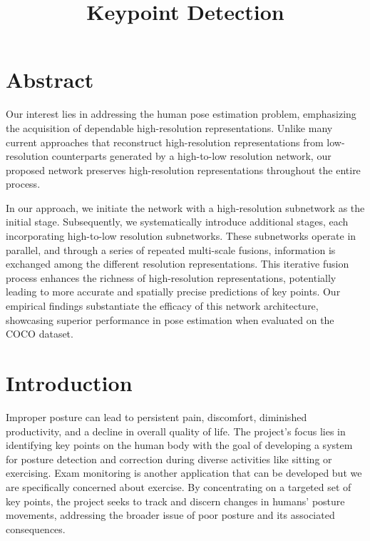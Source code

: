 \documentclass{article}
\title{Keypoint Detection}
\author{
}
\begin{document}
\maketitle

\section{\fontsize{12}{14}\selectfont Abstract}

Our interest lies in addressing the human pose estimation problem, emphasizing the acquisition of dependable high-resolution representations. Unlike many current approaches that reconstruct high-resolution representations from low-resolution counterparts generated by a high-to-low resolution network, our  proposed network preserves high-resolution representations throughout the entire process.

In our approach, we initiate the network with a high-resolution subnetwork as the initial stage. Subsequently, we systematically introduce additional stages, each incorporating high-to-low resolution subnetworks. These subnetworks operate in parallel, and through a series of repeated multi-scale fusions, information is exchanged among the different resolution representations. This iterative fusion process enhances the richness of high-resolution representations, potentially leading to more accurate and spatially precise predictions of key points. Our empirical findings substantiate the efficacy of this network architecture, showcasing superior performance in pose estimation when evaluated on the COCO dataset.


\section{\fontsize{12}{14}\selectfont Introduction}

Improper posture can lead to persistent pain, discomfort, diminished productivity, and a decline in overall quality of life. The project's focus lies in identifying key points on the human body with the goal of developing a system for posture detection and correction during diverse activities like sitting or exercising. Exam monitoring is another application that can be developed but we are specifically concerned about exercise. By concentrating on a targeted set of key points, the project seeks to track and discern changes in humans' posture movements, addressing the broader issue of poor posture and its associated consequences.
\end{document}
